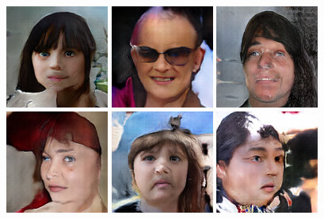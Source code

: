 \begin{figure}[!h]
{    }
    \vspace{0.1cm}
    \centerline{
        \includegraphics[scale=0.485]{figures/ffhq/random/ffhq128x128_image0027.png}
        \includegraphics[scale=0.485]{figures/ffhq/random/ffhq128x128_image0028.png}
        \includegraphics[scale=0.485]{figures/ffhq/random/ffhq128x128_image0029.png}
        \includegraphics[scale=0.485]{figures/ffhq/random/ffhq128x128_image0030.png}
        \includegraphics[scale=0.485]{figures/ffhq/random/ffhq128x128_image0031.png}
        \includegraphics[scale=0.485]{figures/ffhq/random/ffhq128x128_image0032.png}
}
\end{figure}

